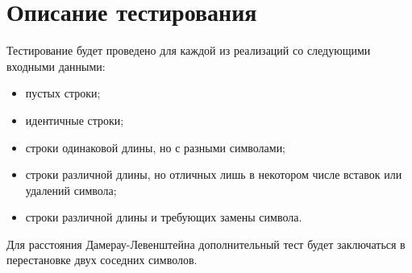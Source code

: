 \section{Описание тестирования}

Тестирование будет проведено для каждой из реализаций со следующими входными данными:
\begin{itemize}
	\item пустых строки;
	\item идентичные строки;
	\item строки одинаковой длины, но с разными символами;
	\item строки различной длины, но отличных лишь в некотором числе вставок или удалений символа;
	\item строки различной длины и требующих замены символа.
\end{itemize}

Для расстояния Дамерау-Левенштейна дополнительный тест будет заключаться в перестановке двух соседних символов.
